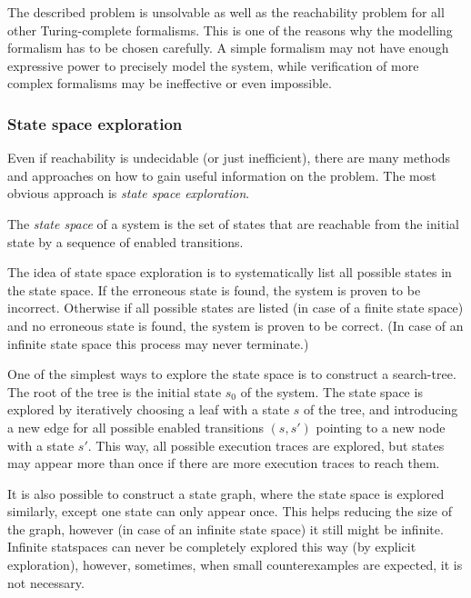 The described problem is unsolvable as well as the reachability problem for all other Turing-complete formalisms. This is one of the reasons why the modelling formalism has to be chosen carefully. A simple formalism may not have enough expressive power to precisely model the system, while verification of more complex formalisms may be ineffective or even impossible.

\subsubsection{State space exploration}

Even if reachability is undecidable (or just inefficient), there are many methods and approaches on how to gain useful information on the problem. The most obvious approach is \emph{state space exploration}.

\begin{dfn}
	The \emph{state space} of a system is the set of states that are reachable from the initial state by a sequence of enabled transitions. 
\end{dfn}

The idea of state space exploration is to systematically list all possible states in the state space. If the erroneous state is found, the system is proven to be incorrect. Otherwise if all possible states are listed (in case of a finite state space) and no erroneous state is found, the system is proven to be correct. (In case of an infinite state space this process may never terminate.)

One of the simplest ways to explore the state space is to construct a search-tree. The root of the tree is the initial state $s_0$ of the system. The state space is explored by iteratively choosing a leaf with a state $s$ of the tree, and introducing a new edge for all possible enabled transitions $(s,s')$ pointing to a new node with a state $s'$. This way, all possible execution traces are explored, but states may appear more than once if there are more execution traces to reach them.

It is also possible to construct a state graph, where the state space is explored similarly, except one state can only appear once. This helps reducing the size of the graph, however (in case of an infinite state space) it still might be infinite. Infinite statspaces can never be completely explored this way (by explicit exploration), however, sometimes, when small counterexamples are expected, it is not necessary.

